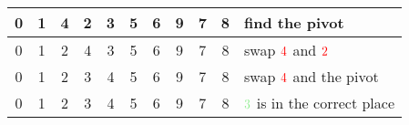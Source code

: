 \begin{center}
\begin{tabular}{ | c | c | c | c | c | c | c | c | c | c || l | }
        \cellcolor{LightGreen}0 & \cellcolor{LightGreen}1 & 4 & 2 & \cellcolor{LightCyan}3 & \cellcolor{LightGreen}5 & \cellcolor{LightGreen}6 & \cellcolor{LightGrey}9 & \cellcolor{LightGrey}7 & \cellcolor{LightGrey}8 &find the {\color{cyan}pivot} \\ \hline
        \cellcolor{LightGreen}0 & \cellcolor{LightGreen}1 & \color{red}2 & \color{red}4 & \cellcolor{LightCyan}3 & \cellcolor{LightGreen}5 & \cellcolor{LightGreen}6 & \cellcolor{LightGrey}9 & \cellcolor{LightGrey}7 & \cellcolor{LightGrey}8 &swap \(\color{red}4\) and \(\color{red}2\) \\ \hline
        \cellcolor{LightGreen}0 & \cellcolor{LightGreen}1 & \color{red}2 & \color{cyan}3 & \color{red}4 & \cellcolor{LightGreen}5 & \cellcolor{LightGreen}6 & \cellcolor{LightGrey}9 & \cellcolor{LightGrey}7 & \cellcolor{LightGrey}8 &swap \(\color{red}4\) and the {\color{cyan}pivot} \\ \hline
        \cellcolor{LightGreen}0 & \cellcolor{LightGreen}1 & 2 & \cellcolor{LightGreen}3 & 4 & \cellcolor{LightGreen}5 & \cellcolor{LightGreen}6 & \cellcolor{LightGrey}9 & \cellcolor{LightGrey}7 & \cellcolor{LightGrey}8 &\(\color{LightGreen}3\) is in the correct place \\ \hline
    \end{tabular}
\end{center}
